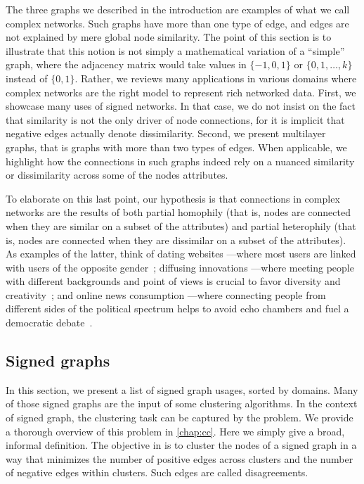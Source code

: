 The three graphs we described in the introduction are examples of what we call complex networks.
Such graphs have more than one type of edge, and edges are not explained by mere global node
similarity. The point of this section is to illustrate that this notion is not simply a mathematical
variation of a \enquote{simple} graph, where the adjacency matrix would take values in $\{-1, 0, 1\}$ or
$\{0, 1, \ldots, k\}$ instead of $\{0, 1\}$. Rather, we reviews many applications in various domains
where complex networks are the right model to represent rich networked data. First, we showcase many
uses of signed networks. In that case, we do not insist on the fact that similarity is not the only
driver of node connections, for it is implicit that negative edges actually denote dissimilarity.
Second, we present multilayer graphs, that is graphs with more than two types of edges. When
applicable, we highlight how the connections in such graphs indeed rely on a nuanced similarity or
dissimilarity across some of the nodes attributes.

To elaborate on this last point, our hypothesis is that connections in complex networks are the
results of both partial homophily (that is, nodes are connected when they are similar on a subset of
the attributes) and partial heterophily (that is, nodes are connected when they are dissimilar on a
subset of the attributes). As examples of the latter, think of dating websites ---where most users
are linked with users of the opposite gender~\autocites{homophilyMyspace09}{Tinder16}; diffusing
innovations ---where meeting people with different backgrounds and point of views is crucial to
favor diversity and creativity~\autocite{rogers2003diffusion}; and online news consumption ---where
connecting people from different sides of the political spectrum helps to avoid echo chambers and
fuel a democratic debate~\autocite{balancedNews17}.

\subsection{Signed graphs}
\label{sub:intro_signed_graphs}

In this section, we present a list of signed graph usages, sorted by domains. Many of those signed
graphs are the input of some clustering algorithms. In the context of signed graph, the clustering
task can be captured by the \pcc{} problem. We provide a thorough overview of this problem in
\autoref{chap:cc}. Here we simply give a broad, informal definition. The objective in \pcc{} is to
cluster the nodes of a signed graph in a way that minimizes the number of positive edges across
clusters and the number of negative edges within clusters. Such edges are called disagreements.



